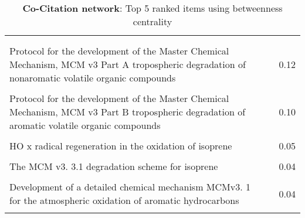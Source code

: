 \begin{table}[H]
     \begin{tabular}{p{}p{}c}
     \toprule
      & & \\\\
     Protocol for the development of the Master Chemical Mechanism, MCM v3 Part A tropospheric degradation of nonaromatic volatile organic compounds & \cite{betweenness0} & 0.12  \\ \\
        Protocol for the development of the Master Chemical Mechanism, MCM v3 Part B tropospheric degradation of aromatic volatile organic compounds & \cite{betweenness1} & 0.10  \\ \\
        HO x radical regeneration in the oxidation of isoprene & \cite{betweenness2} & 0.05  \\ \\
        The MCM v3. 3.1 degradation scheme for isoprene & \cite{betweenness3} & 0.04  \\ \\
        Development of a detailed chemical mechanism MCMv3. 1 for the atmospheric oxidation of aromatic hydrocarbons & \cite{betweenness4} & 0.04  \\ \\
        \bottomrule
    \end{tabular}
    \label{tab:betweenness_Co-Citation}
    \caption{\textbf{Co-Citation network}: Top 5 ranked items using betweenness centrality}
    \end{table}

    
